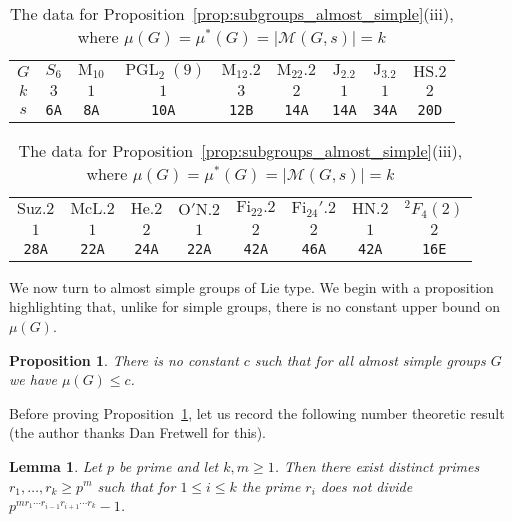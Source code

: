 \documentclass[11pt]{article}
\numberwithin{equation}{section}
\theoremstyle{shdefinition}
\theoremstyle{shplain}
\newtheorem{proposition}[definition]{Proposition}
\newtheorem{lemma}[definition]{Lemma}
\newcommand{\M}{\mathcal{M}}
\newcommand{\<}{\langle}
\renewcommand{\>}{\rangle}
\renewcommand{\leq}{\leqslant}
\renewcommand{\geq}{\geqslant}
\renewcommand{\:}{\colon}
\newcommand{\PGL}{\operatorname{PGL}}
\begin{document}
\begin{table}
\caption{The data for Proposition~\ref{prop:subgroups_almost_simple}(iii), where $\mu(G) = \mu^*(G) = |\M(G,s)| = k$} \label{tab:subgroups_almost_simple}
\centering
\begin{tabular}{ccccccccc}
\hline
$G$      & $S_6$       & $\mathrm{M}_{10}$ & $\PGL_2(9)$  & $\mathrm{M}_{12}.2$ & $\mathrm{M}_{22}.2$ & $\mathrm{J}_2.2$ & $\mathrm{J}_3.2$ & $\mathrm{HS}.2$ \\ 
$k$      & $3$         & $1$               & $1$          & $3$                 & $2$                 & $1$              & $1$              & $2$             \\ 
$s$      & \texttt{6A} & \texttt{8A}       & \texttt{10A} & \texttt{12B}        & \texttt{14A}        & \texttt{14A}     & \texttt{34A}     & \texttt{20D}    \\ 
\hline
\end{tabular} \vspace{5.5pt}

\begin{tabular}{cccccccc}
\hline
$\mathrm{Suz}.2$ & $\mathrm{McL}.2$ & $\mathrm{He}.2$ & $\mathrm{O'N}.2$ & $\mathrm{Fi}_{22}.2$ & $\mathrm{Fi}_{24}'.2$ & $\mathrm{HN}.2$ & ${}^2F_4(2)$ \\
$1$              & $1$              & $2$             & $1$              & $2$                  & $2$                   & $1$             & $2$          \\
\texttt{28A}     & \texttt{22A}     & \texttt{24A}    & \texttt{22A}     & \texttt{42A}         & \texttt{46A}          & \texttt{42A}    & \texttt{16E} \\
\hline
\end{tabular}
\end{table}

We now turn to almost simple groups of Lie type. We begin with a proposition highlighting that, unlike for simple groups, there is no constant upper bound on $\mu(G)$.

\begin{proposition} \label{prop:subgroups_unbounded}
There is no constant $c$ such that for all almost simple groups $G$ we have $\mu(G) \leq c$.
\end{proposition}

Before proving Proposition~\ref{prop:subgroups_unbounded}, let us record the following number theoretic result (the author thanks Dan Fretwell for this).

\begin{lemma} \label{lem:subgroups_unbounded}
Let $p$ be prime and let $k, m \geq 1$. Then there exist distinct primes $r_1,\dots,r_k \geq p^m$ such that for $1 \leq i \leq k$ the prime $r_i$ does not divide $p^{mr_1 \cdots r_{i-1} r_{i+1} \cdots r_k} - 1$.
\end{lemma}
\end{document}
